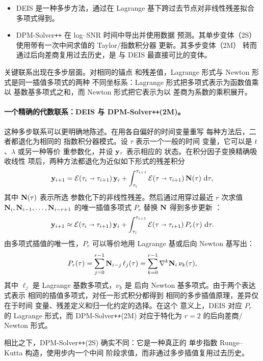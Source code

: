 \begin{itemize}[leftmargin=2em]
    \item {}
DEIS 是一种多步方法，通过在
Lagrange 基下跨过去节点对非线性残差拟合多项式得到。

    \item {}
DPM-Solver\texttt{++} 在 log--SNR 时间中导出并使用数据
预测。其单步变体（2S）使用带有一次中间求值的 Taylor/指数积分器
更新。其多步变体（2M）
转而通过后向差商复用过去历史，是
与 DEIS 最直接可比的变体。
\end{itemize}

关键联系出现在多步层面。对相同的锚点
和残差值，Lagrange 形式与 Newton 形式是同一插值多项式的两种
不同坐标系：Lagrange 形式把多项式表示为函数值乘以
基数基多项式之和，而 Newton 形式把它表示为以
差商为系数的乘积展开。

\paragraph{一个精确的代数联系：DEIS 与
DPM-Solver\texttt{++}(2M)。}
这种多步联系可以更明确地陈述。在用各自偏好的时间变量重写
每种方法后，二者都退化为相同的
指数积分器模式。设 \(\tau\) 表示一个一般的时间
变量，它可以是 \(t\)、\(\lambda\) 或另一种等价
重参数化，并设 \({\mathbf{y}}_\tau\) 表示相应的
状态。在积分因子变换精确吸收线性
项后，两种方法都退化为近似如下形式的残差积分
\[
{\mathbf{y}}_{i+1}
= \mathcal{E}(\tau_i \shortrightarrow \tau_{i+1})\,{\mathbf{y}}_i
+ \int_{\tau_i}^{\tau_{i+1}}
  \mathcal{E}(\tau \shortrightarrow \tau_{i+1})\,
  {\mathbf{N}}(\tau)\,\mathop{}\!\mathrm{d}\tau,
\]
其中 \({\mathbf{N}}(\tau)\) 表示所选
参数化下的非线性残差。然后通过用穿过最近 \(r\) 次求值
\({\mathbf{N}}_i,{\mathbf{N}}_{i-1},\ldots,{\mathbf{N}}_{i-r+1}\) 的唯一插值多项式 \(P_r\) 替换
\({\mathbf{N}}\) 得到多步更新
：
\[
{\mathbf{y}}_{i+1}
\approx \mathcal{E}(\tau_i \shortrightarrow \tau_{i+1})\,{\mathbf{y}}_i
+ \int_{\tau_i}^{\tau_{i+1}}
  \mathcal{E}(\tau \shortrightarrow \tau_{i+1})\,
  P_r(\tau)\,\mathop{}\!\mathrm{d}\tau.
\]
由多项式插值的唯一性，\(P_r\) 可以等价地用 Lagrange 基或后向 Newton 基写出：
\[
P_r(\tau)
= \sum_{j=0}^{r-1} {\mathbf{N}}_{i-j}\,\ell_j(\tau)
= \sum_{k=0}^{r-1} \nabla^k {\mathbf{N}}_i\,\nu_k(\tau),
\]
其中 \(\ell_j\) 是 Lagrange 基数多项式，\(\nu_k\) 是
后向 Newton 基多项式。由于两个表达式表示
相同的插值多项式，对任一形式积分都得到
相同的多步插值原理，差异仅在于时间
变量、残差定义和归一化约定的选择。在这个
意义上，DEIS 对应 \(P_r\) 的 Lagrange 形式，而
DPM-Solver\texttt{++}(2M) 对应于特化为 \(r=2\) 的后向差商/
Newton 形式。

相比之下，DPM-Solver\texttt{++}(2S) 确实不同：它是一种真正的
单步指数 Runge--Kutta 构造，使用步内一个中间
阶段求值，而非通过多步插值复用过去历史。

